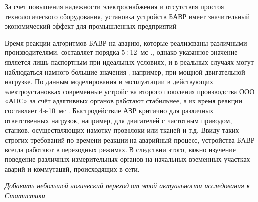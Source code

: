 За счет повышения надежности электроснабжения и отсутствия простоя технологического
оборудования, установка устройств БАВР имеет значительный экономический эффект для
промышленных предприятий\par\vspace{0.2cm}

Время реакции алгоритмов БАВР на аварию, которые реализованы различными производителями,
составляет порядка 5÷12 мс \cite{bavr_bib_011_nikulov_2012}., однако указанное значение
является лишь паспортным при идеальных условиях, и в реальных случаях могут наблюдаться
намного большие значения \cite{bavr_bib_012_a_2020}, например, при мощной двигательной
нагрузке. По данным моделирования и эксплуатации в действующих электроустановках
современные устройства второго поколения производства ООО «АПС» за счёт адаптивных
органов работают стабильнее, а их время реакции составляет 4÷10 мс
\cite{bavr_bib_004_operating_2024}. Быстродействие АВР критично для различных
ответственных нагрузок, например, для двигателей с частотным приводом, станков,
осуществляющих намотку проволоки или тканей и т.д. Ввиду таких строгих требований по
времени реакции на аварийный процесс, устройства БАВР всегда работают в переходных
режимах. В следствии этого, важно изучение поведение различных измерительных органов на
начальных временных участках аварий и коммутаций, происходящих в сети.\par\vspace{0.2cm}

\noindent\textit{Добавить небольшой логический переход от этой актуальности исследования к Статистики}\par\vspace{0.3cm}

\par\vspace{0.3cm}
